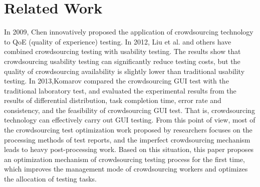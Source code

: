 \section{Related Work}

In 2009, Chen\cite{chen2009crowdsourceable} innovatively proposed the application of crowdsourcing technology to QoE (quality of experience) testing. In 2012, Liu et al.\cite{liu2012crowdsourcing} and others have combined crowdsourcing testing with usability testing. The results show that crowdsourcing usability testing can significantly reduce testing costs, but the quality of crowdsourcing availability is slightly lower than traditional usability testing. In 2013,Komarov\cite{komarov2013crowdsourcing} compared the crowdsourcing GUI test with the traditional laboratory test, and evaluated the experimental results from the results of differential distribution, task completion time, error rate and consistency, and the feasibility of crowdsourcing GUI test. That is, crowdsourcing technology can effectively carry out GUI testing. From this point of view, most of the crowdsourcing test optimization work proposed by researchers focuses on the processing methods of test reports, and the imperfect crowdsourcing mechanism leads to heavy post-processing work. Based on this situation, this paper proposes an optimization mechanism of crowdsourcing testing process for the first time, which improves the management mode of crowdsourcing workers and optimizes the allocation of testing tasks.


